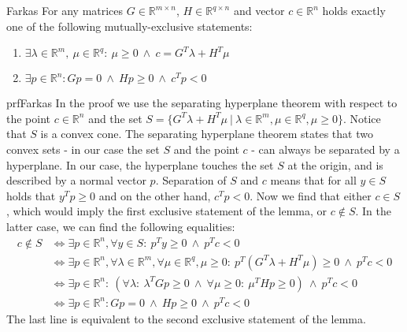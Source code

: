 \begin{lem}{Farkas}
    For any matrices $G \in \mathbb{R}^{m \times n}$, $H \in \mathbb{R}^{q \times n}$ and vector $c \in \mathbb{R}^n$ holds exactly one of the following mutually-exclusive statements:
    \begin{enumerate}
        \item $\exists \lambda \in \mathbb{R}^m, \ \mu \in \mathbb{R}^q: \ \mu \geq 0 \ \land \ c = G^T\lambda + H^T\mu$
        \item $\exists p \in \mathbb{R}^n: Gp = 0 \ \land \ Hp \geq 0 \ \land \ c^Tp < 0$
    \end{enumerate}
\end{lem}

\begin{prf}{prfFarkas}
    In the proof we use the separating hyperplane theorem with respect to the point $c \in \mathbb{R}^n$ and the set $S = \{ G^T\lambda + H^T\mu \ | \ \lambda \in \mathbb{R}^m, \mu \in \mathbb{R}^q, \mu \geq 0\}$. Notice that $S$ is a convex cone. The separating hyperplane theorem states that two convex sets - in our case the set $S$ and the point $c$ - can always be separated by a hyperplane. In our case, the hyperplane touches the set $S$ at the origin, and is described by a normal vector $p$. Separation of $S$ and $c$ means that for all $y \in S$ holds that $y^{T}p \geq 0$ and on the other hand, $c^{T}p < 0$. Now we find that either $c \in S$, which would imply the first exclusive statement of the lemma, or $c \notin S$. In the latter case, we can find the following equalities:
    \begin{align*}
        c \notin S 
            &\Leftrightarrow \exists p \in \mathbb{R}^n, \forall y \in S: \ p^{T}y \geq 0 \ \land \ p^{T}c < 0 \\
            &\Leftrightarrow \exists p \in \mathbb{R}^n, \forall \lambda \in \mathbb{R}^m, \forall \mu \in \mathbb{R}^q, \mu \geq 0: \ p^{T}(G^T\lambda + H^T\mu) \geq 0 \ \land \ p^{T}c < 0 \\
            &\Leftrightarrow \exists p \in \mathbb{R}^n: \ \left(\forall \lambda: \ \lambda^{T}Gp \geq 0 \ \land \ \forall \mu \geq 0: \ \mu^{T}Hp \geq 0 \right) \ \land \ p^{T}c < 0 \\
            &\Leftrightarrow \exists p \in \mathbb{R}^n: Gp = 0 \ \land \ Hp \geq 0 \ \land \ p^{T}c < 0
    \end{align*}
    The last line is equivalent to the second exclusive statement of the lemma.
\end{prf}

